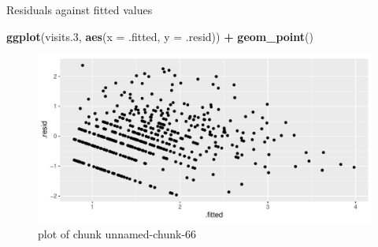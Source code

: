 \documentclass[ignorenonframetext,]{beamer}
\newenvironment{Shaded}{\begin{snugshade}}{\end{snugshade}}
\newcommand{\DataTypeTok}[1]{\textcolor[rgb]{0.13,0.29,0.53}{#1}}
\newcommand{\FloatTok}[1]{\textcolor[rgb]{0.00,0.00,0.81}{#1}}
\newcommand{\KeywordTok}[1]{\textcolor[rgb]{0.13,0.29,0.53}{\textbf{#1}}}
\newcommand{\NormalTok}[1]{#1}
\newcommand{\OperatorTok}[1]{\textcolor[rgb]{0.81,0.36,0.00}{\textbf{#1}}}
\newcommand{\StringTok}[1]{\textcolor[rgb]{0.31,0.60,0.02}{#1}}
\begin{document}
\begin{frame}[fragile]{Residuals against fitted values}
\protect\hypertarget{residuals-against-fitted-values}{}

\begin{Shaded}
\begin{Highlighting}[]
\KeywordTok{ggplot}\NormalTok{(visits}\FloatTok{.3}\NormalTok{, }\KeywordTok{aes}\NormalTok{(}\DataTypeTok{x =}\NormalTok{ .fitted, }\DataTypeTok{y =}\NormalTok{ .resid)) }\OperatorTok{+}
\StringTok{  }\KeywordTok{geom_point}\NormalTok{()}
\end{Highlighting}
\end{Shaded}

\begin{figure}
\centering
\includegraphics{figure/unnamed-chunk-66-1.pdf}
\caption{plot of chunk unnamed-chunk-66}
\end{figure}

\end{frame}
\end{document}
